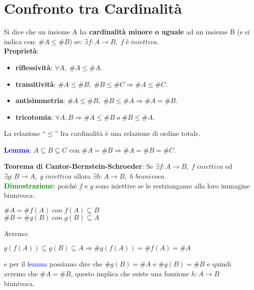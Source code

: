 \section{Confronto tra Cardinalità}
Si dice che un insieme A ha \textbf{cardinalità minore o uguale} ad un insieme B (e si indica con: $\#A \leq \#B$) se: $\exists f : A \rightarrow B, \; f \; è \; iniettiva$. \\
\textbf{Proprietà}:
\begin{itemize}[nosep]
    \item \textbf{riflessività}: $\forall A, \; \#A \leq \#A$.
    \item \textbf{transitività}: $\#A \leq \#B, \; \#B \leq \#C \Rightarrow \#A \leq \#C$.
    \item \textbf{antisimmetria}: $\#A \leq \#B, \; \#B \leq \#A \Rightarrow \#A = \#B$.
    \item \textbf{tricotomia}: $\forall A, B \Rightarrow \#A \leq \#B \; o \; \#B \leq \#A$.
\end{itemize}
La relazione ``$\leq$'' fra cardinalità è una relazione di ordine totale.

\begin{boxA}
    \textcolor{blue}{\textbf{Lemma}}: $A \subseteq B \subseteq C$ con $\#A = \#B \Rightarrow \#A = \#B = \#C$.
\end{boxA}

\textbf{Teorema di Cantor-Bernstein-Schroeder}: Se $\exists f : A \rightarrow B, \; f \; iniettiva$ ed $\exists g : B \rightarrow A, \; g \; iniettiva$ allora $\exists h : A \rightarrow B, \; h \; biunivoca$. \\
\textcolor{green}{\textbf{Dimostrazione}}: poiché $f$ e $g$ sono iniettive se le restriangamo alla loro immagine biunivoca:
\begin{center}
    $\#A = \#f(A) \; con \; f(A) \subseteq B$ \\
    $\#B = \#g(B) \; con \; g(B) \subseteq A$ \\
\end{center}
Avremo:
\begin{center}
    $g(f(A)) \subseteq g(B) \subseteq A \Rightarrow \#g(f(A)) = \#f(A) = \#A$
\end{center}
e per il \textcolor{blue}{lemma} possiamo dire che $\#g(B) = \#A$ e $\#g(B) = \#B$ e quindi avremo che $\#A = \#B$, questo implica che esiste una funzione $h : A \rightarrow B$ biunivoca.

